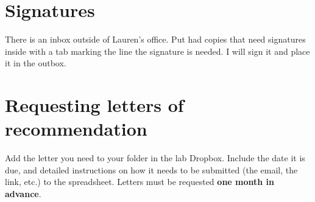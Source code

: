 \documentclass[12pt]{article}
\begin{document}
\section{Signatures}
There is an inbox outside of Lauren's office. Put had copies that need
signatures inside with a tab marking the line the signature is
needed. I will sign it and place it in the outbox.

\section{Requesting letters of recommendation}
Add the letter you need to your folder in the lab Dropbox. Include the
date it is due, and detailed instructions on how it needs to be
submitted (the email, the link, etc.) to the spreadsheet. Letters must
be requested \textbf{one month in advance}.
\end{document}
